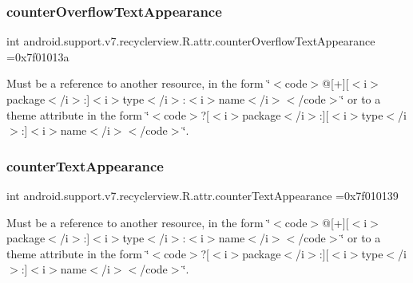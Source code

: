 \subsubsection{\texorpdfstring{counter\+Overflow\+Text\+Appearance}{counterOverflowTextAppearance}}
{\footnotesize\ttfamily int android.\+support.\+v7.\+recyclerview.\+R.\+attr.\+counter\+Overflow\+Text\+Appearance =0x7f01013a\hspace{0.3cm}{\ttfamily [static]}}

Must be a reference to another resource, in the form \char`\"{}$<$code$>$@\mbox{[}+\mbox{]}\mbox{[}$<$i$>$package$<$/i$>$\+:\mbox{]}$<$i$>$type$<$/i$>$\+:$<$i$>$name$<$/i$>$$<$/code$>$\char`\"{} or to a theme attribute in the form \char`\"{}$<$code$>$?\mbox{[}$<$i$>$package$<$/i$>$\+:\mbox{]}\mbox{[}$<$i$>$type$<$/i$>$\+:\mbox{]}$<$i$>$name$<$/i$>$$<$/code$>$\char`\"{}. \mbox{\label{classandroid_1_1support_1_1v7_1_1recyclerview_1_1R_1_1attr_ac625fe710caa689c48fe3395dfcce88a}} 
\subsubsection{\texorpdfstring{counter\+Text\+Appearance}{counterTextAppearance}}
{\footnotesize\ttfamily int android.\+support.\+v7.\+recyclerview.\+R.\+attr.\+counter\+Text\+Appearance =0x7f010139\hspace{0.3cm}{\ttfamily [static]}}

Must be a reference to another resource, in the form \char`\"{}$<$code$>$@\mbox{[}+\mbox{]}\mbox{[}$<$i$>$package$<$/i$>$\+:\mbox{]}$<$i$>$type$<$/i$>$\+:$<$i$>$name$<$/i$>$$<$/code$>$\char`\"{} or to a theme attribute in the form \char`\"{}$<$code$>$?\mbox{[}$<$i$>$package$<$/i$>$\+:\mbox{]}\mbox{[}$<$i$>$type$<$/i$>$\+:\mbox{]}$<$i$>$name$<$/i$>$$<$/code$>$\char`\"{}. \mbox{\label{classandroid_1_1support_1_1v7_1_1recyclerview_1_1R_1_1attr_ae79d1f3f25118e898c70ce645170394a}} 
